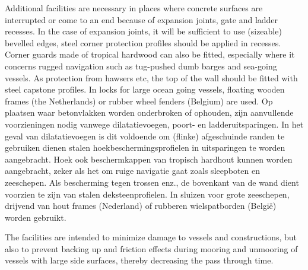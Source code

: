 Additional facilities are necessary in places where concrete surfaces are interrupted or come to an end
because of expansion joints, gate and ladder recesses. In the case of expansion joints, it will be sufficient
to use (sizeable) bevelled edges, steel corner protection profiles should be applied in recesses. Corner
guards made of tropical hardwood can also be fitted, especially where it concerns rugged navigation
such as tug-pushed dumb barges and sea-going vessels. As protection from hawsers etc, the top of the
wall should be fitted with steel capstone profiles. In locks for large ocean going vessels, floating wooden
frames (the Netherlands) or rubber wheel fenders (Belgium) are used.
Op plaatsen waar betonvlakken worden onderbroken of ophouden, zijn aanvullende voorzieningen nodig
vanwege dilatatievoegen, poort- en ladderuitsparingen. In het geval van dilatatievoegen is dit voldoende
om (flinke) afgeschuinde randen te gebruiken dienen stalen hoekbeschermingsprofielen in uitsparingen te worden aangebracht. Hoek
ook beschermkappen van tropisch hardhout kunnen worden aangebracht, zeker als het om ruige navigatie gaat
zoals sleepboten en zeeschepen. Als bescherming tegen trossen enz., de bovenkant van de
wand dient voorzien te zijn van stalen deksteenprofielen. In sluizen voor grote zeeschepen, drijvend van hout
frames (Nederland) of rubberen wielspatborden (België) worden gebruikt.

The facilities are intended to minimize damage to vessels and constructions, but also to prevent backing
up and friction effects during mooring and unmooring of vessels with large side surfaces, thereby
decreasing the pass through time.

